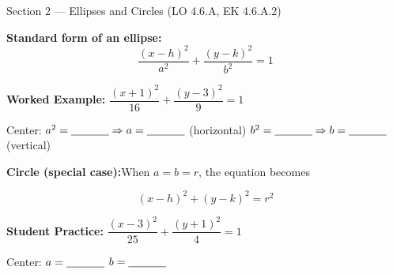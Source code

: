 \documentclass[10pt]{article}
\begin{document}
\vspace{0.08in}

\begin{notesbox}{Section 2 --- Ellipses and Circles (LO 4.6.A, EK 4.6.A.2)}

\textbf{Standard form of an ellipse:}
\[
  \frac{(x-h)^2}{a^2} + \frac{(y-k)^2}{b^2} = 1
\]

\textbf{Worked Example:}\quad
$\dfrac{(x+1)^2}{16} + \dfrac{(y-3)^2}{9} = 1$

\vspace{6pt}
Center: \blank{3cm} \quad
$a^2 = \blank{1.2cm} \Rightarrow a = \blank{1.2cm}$ (horizontal) \quad
$b^2 = \blank{1.2cm} \Rightarrow b = \blank{1.2cm}$ (vertical)

\vspace{10pt}
\textbf{Circle (special case):}\quad When $a = b = r$, the equation becomes

\[
  (x - h)^2 + (y - k)^2 = r^2
\]

\textbf{Student Practice:}\quad
$\dfrac{(x-3)^2}{25} + \dfrac{(y+1)^2}{4} = 1$

Center: \blank{3cm} \quad $a = \blank{1.2cm}$ \quad $b = \blank{1.2cm}$

\end{notesbox}

\vspace{0.08in}
\end{document}
